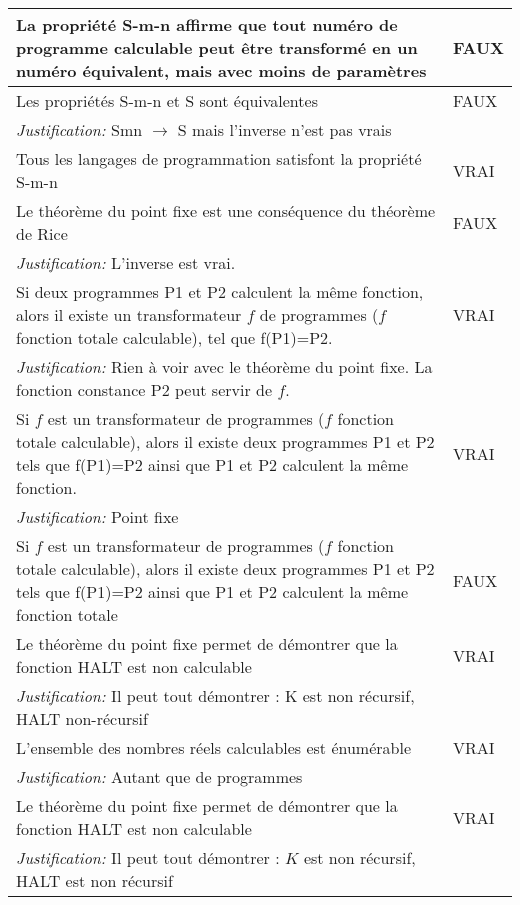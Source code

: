 \begin{longtable}{p{13cm}|l}
    La propriété S-m-n affirme que tout numéro de programme calculable peut être transformé en un numéro équivalent, mais avec moins de paramètres & FAUX \\
     \hline
    
    Les propriétés S-m-n et S sont équivalentes & FAUX \\
    \textit{Justification:} Smn $\rightarrow$ S mais l'inverse n'est pas vrais \\
     \hline
    
    Tous les langages de programmation satisfont la propriété S-m-n & VRAI \\
     \hline
     
     Le théorème du point fixe est une conséquence du théorème de Rice & FAUX\\
     \textit{Justification:} L'inverse est vrai. & \\
     \hline
     Si deux programmes P1 et P2 calculent la même fonction, alors il existe un transformateur $f$ de programmes ($f$ fonction totale calculable), tel que f(P1)=P2. & VRAI \\
     \textit{Justification:} Rien à voir avec le théorème du point fixe. La fonction constance P2 peut servir de $f$. & \\
     \hline
     
     Si $f$ est un transformateur de programmes ($f$ fonction totale calculable), alors il existe deux programmes P1 et P2 tels que f(P1)=P2 ainsi que P1 et P2 calculent la même fonction. & VRAI \\
     \textit{Justification:} Point fixe & \\
     \hline
     
     Si $f$ est un transformateur de programmes ($f$ fonction totale calculable), alors il existe deux programmes P1 et P2 tels que f(P1)=P2 ainsi que P1 et P2 calculent la même fonction totale & FAUX \\
     \hline
     
     Le théorème du point fixe permet de démontrer que la fonction HALT est non calculable & VRAI \\
     \textit{Justification:} Il peut tout démontrer : K est non récursif, HALT non-récursif & \\
     \hline
     
     L'ensemble des nombres réels calculables est énumérable & VRAI \\
     \textit{Justification:} Autant que de programmes & \\ \hline
     Le théorème du point fixe permet de démontrer que la fonction HALT est non calculable & VRAI \\
     \textit{Justification:} Il peut tout démontrer : $K$ est non récursif, HALT est non récursif & \\
      \hline
\end{longtable}